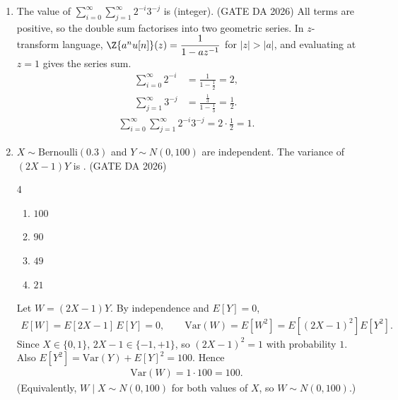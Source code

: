 \begin{enumerate}[label=\textbf{Q.\arabic*},leftmargin=*,start=1]
\item[\textbf{Q.35}] The value of $\displaystyle\sum_{i=0}^{\infty}\sum_{j=1}^{\infty}2^{-i}3^{-j}$
is \underline{\hspace{1.5cm}} (integer).
\hfill (GATE DA 2026)
\solution
All terms are positive, so the double sum factorises into two geometric series. In
$z$-transform language, $\Z\{a^n u[n]\}(z)=\dfrac{1}{1-az^{-1}}$ for $|z|>|a|$, and
evaluating at $z=1$ gives the series sum.
\begin{align}
\sum_{i=0}^\infty 2^{-i}&=\frac{1}{1-\tfrac12}=2,\\
\sum_{j=1}^\infty 3^{-j}&=\frac{\tfrac13}{1-\tfrac13}=\frac12 .
\end{align}
\begin{align}
\sum_{i=0}^{\infty}\sum_{j=1}^{\infty}2^{-i}3^{-j}=2\cdot\frac12=\boxed{1}.
\end{align}

\item[\textbf{Q.44}] $X\sim\text{Bernoulli}(0.3)$ and $Y\sim N(0,100)$ are
independent. The variance of $(2X-1)Y$ is \underline{\hspace{1.5cm}}.
\hfill (GATE DA 2026)
\begin{multicols}{4}
\begin{enumerate}[label=(\alph*),itemsep=0pt]
 \item $100$ \item $90$ \item $49$ \item $21$
\end{enumerate}
\end{multicols}
\solution
Let $W=(2X-1)Y$. By independence and $E[Y]=0$,
\begin{align}
E[W]=E[2X-1]\,E[Y]=0,\qquad
\mathrm{Var}(W)=E[W^2]=E\!\left[(2X-1)^2\right]E[Y^2].
\end{align}
Since $X\in\{0,1\}$, $2X-1\in\{-1,+1\}$, so $(2X-1)^2=1$ with probability $1$.
Also $E[Y^2]=\mathrm{Var}(Y)+E[Y]^2=100$. Hence
\begin{align}
\mathrm{Var}(W)=1\cdot100=\boxed{100}.
\end{align}
(Equivalently, $W\mid X\sim N(0,100)$ for both values of $X$, so $W\sim N(0,100)$.)


\end{enumerate}
